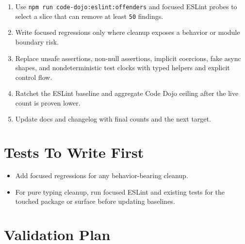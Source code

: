 \begin{enumerate}
\def\labelenumi{\arabic{enumi}.}
\tightlist
\item
  Use \texttt{n\allowbreak{}p\allowbreak{}m\allowbreak{} \allowbreak{}r\allowbreak{}u\allowbreak{}n\allowbreak{} \allowbreak{}c\allowbreak{}o\allowbreak{}d\allowbreak{}e\allowbreak{}-\allowbreak{}d\allowbreak{}o\allowbreak{}j\allowbreak{}o\allowbreak{}:\allowbreak{}e\allowbreak{}s\allowbreak{}l\allowbreak{}i\allowbreak{}n\allowbreak{}t\allowbreak{}:\allowbreak{}o\allowbreak{}f\allowbreak{}f\allowbreak{}e\allowbreak{}n\allowbreak{}d\allowbreak{}e\allowbreak{}r\allowbreak{}s} and focused ESLint probes to select a slice that can remove at least \texttt{5\allowbreak{}0} findings.
\item
  Write focused regressions only where cleanup exposes a behavior or module boundary risk.
\item
  Replace unsafe assertions, non-null assertions, implicit coercions, fake async shapes, and nondeterministic test clocks with typed helpers and explicit control flow.
\item
  Ratchet the ESLint baseline and aggregate Code Dojo ceiling after the live count is proven lower.
\item
  Update docs and changelog with final counts and the next target.
\end{enumerate}

\section{Tests To Write First}\label{record-236-tests-to-write-first}

\begin{itemize}
\tightlist
\item
  Add focused regressions for any behavior-bearing cleanup.
\item
  For pure typing cleanup, run focused ESLint and existing tests for the touched package or surface before updating baselines.
\end{itemize}

\section{Validation Plan}\label{record-236-validation-plan}

